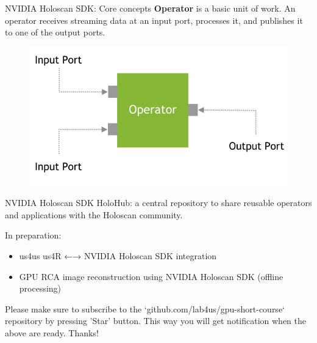 \documentclass[xcolor=table]{beamer}
\begin{document}
\begin{frame}{NVIDIA Holoscan SDK: Core concepts}
  \textbf{Operator} is a basic unit of work. An operator receives streaming data
  at an input port, processes it, and publishes it to one of the output ports.

  \begin{figure}
    \includegraphics[scale=0.2]{imgs/holoscan_operator.png}
  \end{figure}
  
\end{frame}


\begin{frame}{NVIDIA Holoscan SDK}
  HoloHub: a central repository to share reusable operators and applications with the Holoscan community.
  
  In preparation:
  \begin{itemize}
    \item us4us us4R ←→ NVIDIA Holoscan SDK integration
    \item GPU RCA image reconstruction using NVIDIA Holoscan SDK (offline processing)
    \end{itemize}

    Please make sure to subscribe to the `github.com/lab4us/gpu-short-course`
    repository by pressing 'Star' button. This way you will get notification
    when the above are ready. Thanks!

\end{frame}
\end{document}
